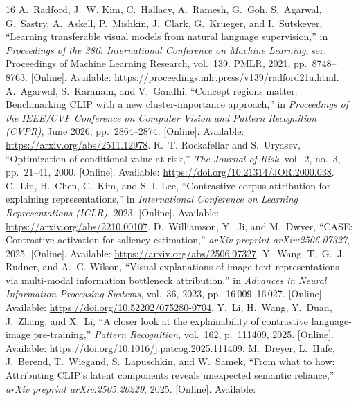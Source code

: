 \begin{thebibliography}{16}
A.~Radford, J.~W. Kim, C.~Hallacy, A.~Ramesh, G.~Goh, S.~Agarwal, G.~Sastry,
A.~Askell, P.~Mishkin, J.~Clark, G.~Krueger, and I.~Sutskever, ``Learning
transferable visual models from natural language supervision,'' in
\emph{Proceedings of the 38th International Conference on Machine Learning},
ser. Proceedings of Machine Learning Research, vol.~139. PMLR, 2021,
pp.~8748--8763. [Online]. Available:
\url{https://proceedings.mlr.press/v139/radford21a.html}.
A.~Agarwal, S.~Karanam, and V.~Gandhi, ``Concept regions matter: Benchmarking
{CLIP} with a new cluster-importance approach,'' in \emph{Proceedings of the
IEEE/CVF Conference on Computer Vision and Pattern Recognition (CVPR)}, June
2026, pp.~2864--2874. [Online]. Available:
\url{https://arxiv.org/abs/2511.12978}.
R.~T. Rockafellar and S.~Uryasev, ``Optimization of conditional value-at-risk,''
\emph{The Journal of Risk}, vol.~2, no.~3, pp.~21--41, 2000. [Online]. Available:
\url{https://doi.org/10.21314/JOR.2000.038}.
C.~Lin, H.~Chen, C.~Kim, and S.-I. Lee, ``Contrastive corpus attribution for
explaining representations,'' in \emph{International Conference on Learning
Representations (ICLR)}, 2023. [Online]. Available:
\url{https://arxiv.org/abs/2210.00107}.
D.~Williamson, Y.~Ji, and M.~Dwyer, ``{CASE}: Contrastive activation for saliency
estimation,'' \emph{arXiv preprint arXiv:2506.07327}, 2025. [Online]. Available:
\url{https://arxiv.org/abs/2506.07327}.
Y.~Wang, T.~G.~J. Rudner, and A.~G. Wilson, ``Visual explanations of image-text
representations via multi-modal information bottleneck attribution,'' in
\emph{Advances in Neural Information Processing Systems}, vol.~36, 2023,
pp.~16\,009--16\,027. [Online]. Available:
\url{https://doi.org/10.52202/075280-0704}.
Y.~Li, H.~Wang, Y.~Duan, J.~Zhang, and X.~Li, ``A closer look at the explainability
of contrastive language-image pre-training,'' \emph{Pattern Recognition},
vol.~162, p.~111409, 2025. [Online]. Available:
\url{https://doi.org/10.1016/j.patcog.2025.111409}.
M.~Dreyer, L.~Hufe, J.~Berend, T.~Wiegand, S.~Lapuschkin, and W.~Samek, ``From
what to how: Attributing {CLIP}'s latent components reveals unexpected semantic
reliance,'' \emph{arXiv preprint arXiv:2505.20229}, 2025. [Online]. Available:

\end{thebibliography}
